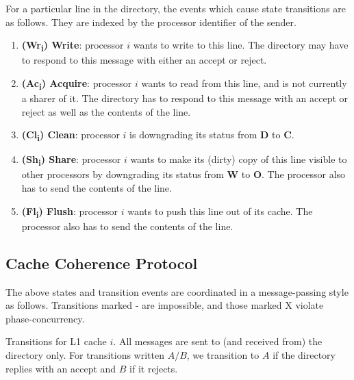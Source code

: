 \documentclass{article}
\begin{document}
For a particular line in the directory, the events which cause state transitions are as follows. They are indexed by the processor identifier of the sender.

\begin{enumerate}
\item \textbf{(Wr\textsubscript{i}) Write}: processor $i$ wants to write to this line. The directory may have to respond to this message with either an accept or reject.
\item \textbf{(Ac\textsubscript{i}) Acquire}: processor $i$ wants to read from this line, and is not currently a sharer of it. The directory has to respond to this message with an accept or reject as well as the contents of the line.
\item \textbf{(Cl\textsubscript{i}) Clean}: processor $i$ is downgrading its status from \textbf{D} to \textbf{C}.
\item \textbf{(Sh\textsubscript{i}) Share}: processor $i$ wants to make its (dirty) copy of this line visible to other processors by downgrading its status from \textbf{W} to \textbf{O}. The processor also has to send the contents of the line.
\item \textbf{(Fl\textsubscript{i}) Flush}: processor $i$ wants to push this line out of its cache. The processor also has to send the contents of the line.
\end{enumerate}

\subsection{Cache Coherence Protocol}
The above states and transition events are coordinated in a message-passing style as follows. Transitions marked - are impossible, and those marked X violate phase-concurrency.

Transitions for L1 cache $i$. All messages are sent to (and received from) the directory only. For transitions written $A/B$, we transition to $A$ if the directory replies with an accept and $B$ if it rejects.
\end{document}

